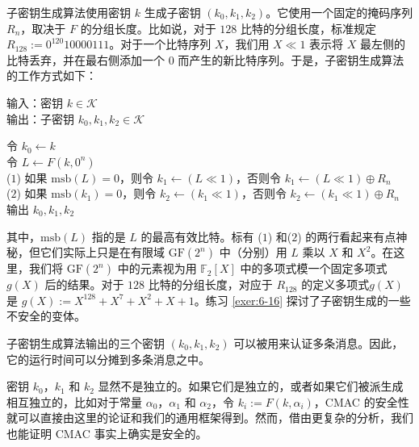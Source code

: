 \begin{snote}[子密钥生成。]
子密钥生成算法使用密钥 $k$ 生成子密钥 $(k_0,k_1,k_2)$。它使用一个固定的掩码序列 $R_n$，取决于 $F$ 的分组长度。比如说，对于 $128$ 比特的分组长度，标准规定 $R_{128}:=0^{120}10000111$。对于一个比特序列 $X$，我们用 $X\ll1$ 表示将 $X$ 最左侧的比特丢弃，并在最右侧添加一个 $0$ 而产生的新比特序列。于是，子密钥生成算法的工作方式如下：

\vspace{5pt}

\hspace*{5pt} 输入：密钥 $k\in\mathcal{K}$\\
\hspace*{26pt} 输出：子密钥 $k_0,k_1,k_2\in\mathcal{K}$

\vspace{3pt}

\hspace*{5pt} 令 $k_0\leftarrow k$\\
\hspace*{26pt} 令 $L\leftarrow F(k,0^n)$\\
\hspace*{1pt} ($1$)
\hspace*{4.5pt} 如果 $\mathrm{msb}(L)=0$，则令 $k_1\leftarrow (L\ll1)$，否则令 $k_1\leftarrow(L\ll1)\oplus R_n$\\
\hspace*{1pt} ($2$)
\hspace*{4.5pt} 如果 $\mathrm{msb}(k_1)=0$，则令 $k_2\leftarrow (k_1\ll1)$，否则令 $k_2\leftarrow(k_1\ll1)\oplus R_n$\\
\hspace*{26pt} 输出 $k_0,k_1,k_2$

\vspace{5pt}

\noindent
其中，$\mathrm{msb}(L)$ 指的是 $L$ 的最高有效比特。标有 ($1$) 和($2$) 的两行看起来有点神秘，但它们实际上只是在有限域 $\mathrm{GF}(2^n)$ 中（分别）用 $L$ 乘以 $X$ 和 $X^2$。在这里，我们将 $\mathrm{GF}(2^n)$ 中的元素视为用 $\mathbb{F}_2[X]$ 中的多项式模一个固定多项式 $g(X)$ 后的结果。对于 $128$ 比特的分组长度，对应于 $R_{128}$ 的定义多项式$g(X)$ 是 $g(X):=X^{128}+X^7+X^2+X+1$。练习 \ref{exer:6-16} 探讨了子密钥生成的一些不安全的变体。

子密钥生成算法输出的三个密钥 $(k_0,k_1,k_2)$ 可以被用来认证多条消息。因此，它的运行时间可以分摊到多条消息之中。

密钥 $k_0$，$k_1$ 和 $k_2 $ 显然不是独立的。如果它们是独立的，或者如果它们被派生成相互独立的，比如对于常量 $\alpha_0$，$\alpha_1$ 和 $\alpha_2$，令 $k_i:=F(k,\alpha_i)$，CMAC 的安全性就可以直接由这里的论证和我们的通用框架得到。然而，借由更复杂的分析，我们也能证明 CMAC 事实上确实是安全的。
\end{snote}